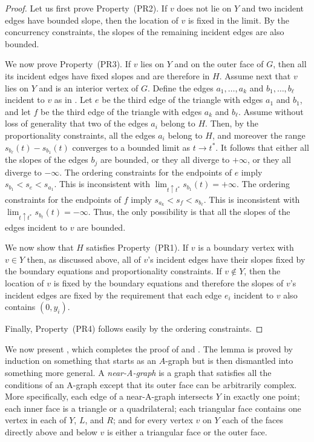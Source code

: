 	\begin{proof}
		Let us first prove Property~(PR2).	If $v$ does not lie on $Y$ and two incident edges have bounded slope, then the location of $v$ is fixed in the limit.
		By the concurrency constraints, the slopes of the remaining incident
		edges are also bounded.
		
		We now prove Property~(PR3). If $v$ lies on $Y$ and on the outer face of $G$, then all its incident edges have fixed slopes and are therefore in $H$. Assume next that $v$ lies on $Y$ and is an interior vertex of $G$.  Define the edges $a_1,\ldots,a_k$
		and $b_1,\ldots,b_\ell$ incident to $v$ as in .  Let $e$ be the third edge of the triangle with edges $a_1$ and $b_1$, and let
		$f$ be the third edge of the triangle with edges $a_k$ and $b_\ell$.
		Assume without loss of generality that two of the edges $a_i$ belong to $H$. Then, by the proportionality constraints, all the edges $a_i$ belong to $H$, and moreover the range $s_{b_\ell}(t)-s_{b_1}(t)$ converges to a bounded limit as $t\to t^*$.  It follows that either all the slopes of the edges $b_j$ are bounded, or they all diverge to $+\infty$,
		or they all diverge to $-\infty$. The ordering constraints for the
		endpoints of $e$ imply \begin{math}
		s_{b_1}<s_e<s_{a_1}
		\end{math}.
		This is inconsistent with $\lim_{t\uparrow t^*} s_{b_1}(t)=+\infty$.
		The ordering constraints for the endpoints of $f$ imply
		\begin{math}
		s_{a_k}<s_f<s_{b_\ell}
		\end{math}.
		This is inconsistent with $\lim_{t\uparrow t^*} s_{b_\ell}(t)=-\infty$. Thus, the only
		possibility is that all the slopes of the edges incident to $v$ are bounded.
		
		We now show that $H$ satisfies Property~(PR1).  If $v$ is a boundary
		vertex with $v\in Y$ then, as discussed above, all of $v$'s incident edges
		have their slopes fixed by the boundary equations and proportionality
		constraints.  If $v\not\in Y$, then the location of $v$ is fixed by the
		boundary equations and therefore the slopes of $v$'s incident edges
		are fixed by the requirement that each edge $e_i$ incident to $v$ also
		contains $(0,y_i)$.
		
		Finally, Property~(PR4) follows easily by the ordering constraints.
	\end{proof}
	
We now present , which completes the proof of  and . The lemma is proved by induction on something
that starts as an $A$-graph but is then dismantled into something
more general.  A \emph{near-A-graph} is a graph that satisfies all the
conditions of an A-graph except that its outer face can be arbitrarily
complex.  More specifically, each edge of a near-A-graph intersects $Y$
in exactly one point; each inner face is a triangle or a quadrilateral;
each triangular face contains one vertex in each of $Y$, $L$, and $R$;
and for every vertex $v$ on $Y$ each of the faces directly above and
below $v$ is either a triangular face or the outer face.


